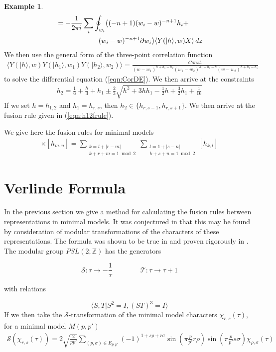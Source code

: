 \documentclass[a4paper,reqno,12pt]{report}
\theoremstyle{definition}
\newtheorem{exmp}{Example}[section]
\newcommand{\bra}{\langle}
\newcommand{\ket}{\rangle}
\numberwithin{equation}{section}
\let\originalleft\left     %
\let\originalright\right
\renewcommand{\left}{\mathopen{}\mathclose\bgroup\originalleft}
\renewcommand{\right}{\aftergroup\egroup\originalright}
\theoremstyle{plain}
\begin{document}
\begin{exmp}
\begin{align*}
& =  -\frac{1}{2\pi i}\sum_i  \oint_{w_i} \left( (-n+1) (w_i-w)^{-n+1}h_i +\right. 
\\ & \qquad \qquad \qquad  \left. (w_i-w)^{-n+1}\partial w_i \right) \bra Y(|h\ket, w) X \ket \, dz
\end{align*}
We then use the general form of the three-point correlation function \cite{MatCFT97}
\begin{align*}
\bra  Y(|h\ket,w) Y(|h_{1}\ket,w_1) Y(|h_{2}\ket,w_2) \ket = \frac{Const.}{(w-w_1)^{h+h_1-h_2}(w_1-w_2)^{h_1+h_2-h}(w-w_2)^{h+h_2-h_1}}
\end{align*}
to solve the differential equation (\ref{eqn:CorDE}). We then arrive at the constraints
\begin{align*}
h_2 = \frac{1}{6} + \frac{h}{3} + h_1 \pm \frac{2}{3} \sqrt{h^2 + 3hh_1 -\frac{1}{2}h + \frac{3}{2}h_1 + \frac{1}{16}}
\end{align*}
If we set $h = h_{1,2}$ and $h_1 = h_{r,s}$, then $h_2 \in \{h_{r,s-1},h_{r,s+1}\}$. We then arrive at the fusion rule given in (\ref{eqn:h12frule}).
\end{exmp}

We give here the fusion rules for minimal models
\begin{align*}
[h_{r,s}] \times [h_{m,n}] = \sum_{\substack{k=l+|r-m|\\ k+r+m=1 \bmod 2}}\sum_{\substack{l=1+|s-n|\\ k+s+n=1 \bmod 2}}[h_{k,l}]
\end{align*}

\section{Verlinde Formula}

In the previous section we give a method for calculating the fusion rules between representations in minimal models. It was conjectured in \cite{Ver88} that this may be found by consideration of modular transformations of the characters of these representations. The formula was shown to be true in \cite{MooCla89} and proven rigorously in \cite{HuaVer04}. The modular group $PSL(2;\mathbb{Z})$ has the generators

\begin{equation}
\mathcal{S} : \tau \rightarrow -\frac{1}{\tau} \qquad \qquad \mathcal{T} : \tau \rightarrow \tau + 1
\end{equation}

with relations

\begin{equation}
\langle S,T | S^2 = I, (ST)^3=I \rangle
\end{equation}
If we then take the $\mathcal{S}$-transformation of the minimal model characters $\chi_{r,s}(\tau)$, for a minimal model $M(p,p')$
\begin{align}
\mathcal{S}(\chi_{r,s}(\tau)) = 2\sqrt{\frac{2}{pp'}}\sum_{(p,\sigma)\in E_{p,p'}}(-1)^{1+s\rho+r\sigma}\sin(\pi \frac{p}{p'} r \rho) \sin(\pi \frac{p}{p'} s\sigma)\chi_{\rho,\sigma}(\tau)
\end{align}
\end{document}
